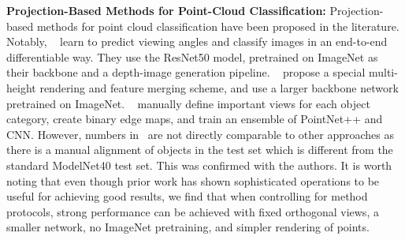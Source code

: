 \documentclass{article}
\begin{document}
\noindent\textbf{Projection-Based Methods for Point-Cloud Classification: } Projection-based methods for point cloud classification have been proposed in the literature. Notably, ~\cite{roveri2018network} learn to predict viewing angles and classify images in an end-to-end differentiable way. They use the ResNet50 model, pretrained on ImageNet as their backbone and a depth-image generation pipeline. ~\cite{sarkar2018learning} propose a special multi-height rendering and feature merging scheme, and use a larger backbone network pretrained on ImageNet. ~\cite{ahmedepn} manually define important views for each object category, create binary edge maps, and train an ensemble of PointNet++ and CNN. However, numbers in~\cite{ahmedepn} are not directly comparable to other approaches as there is a manual alignment of objects in the test set which is different from the standard ModelNet40 test set. This was confirmed with the authors. It is worth noting that even though prior work has shown sophisticated operations to be useful for achieving good results, we find that when controlling for method protocols, strong performance can be achieved with fixed orthogonal views, a smaller network, no ImageNet pretraining, and simpler rendering of points.
\end{document}
